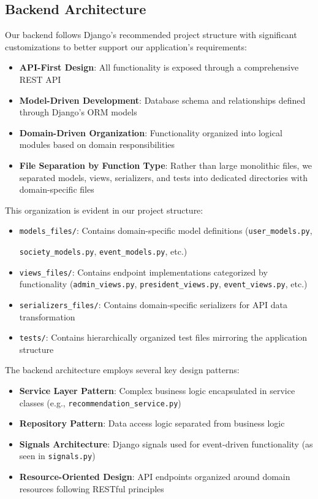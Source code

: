 \subsection{Backend Architecture}

Our backend follows Django's recommended project structure with significant customizations to better support our application's requirements:

\begin{itemize}
    \item \textbf{API-First Design}: All functionality is exposed through a comprehensive REST API
    \item \textbf{Model-Driven Development}: Database schema and relationships defined through Django's ORM models
    \item \textbf{Domain-Driven Organization}: Functionality organized into logical modules based on domain responsibilities
    \item \textbf{File Separation by Function Type}: Rather than large monolithic files, we separated models, views, serializers, and tests into dedicated directories with domain-specific files
\end{itemize}

This organization is evident in our project structure:

\begin{itemize}
    \item \texttt{models\_files/}: Contains domain-specific model definitions (\texttt{user\_models.py}, 
    
    \texttt{society\_models.py}, \texttt{event\_models.py}, etc.)
    \item \texttt{views\_files/}: Contains endpoint implementations categorized by functionality (\texttt{admin\_views.py}, \texttt{president\_views.py}, \texttt{event\_views.py}, etc.)
    \item \texttt{serializers\_files/}: Contains domain-specific serializers for API data transformation
    \item \texttt{tests/}: Contains hierarchically organized test files mirroring the application structure
\end{itemize}

The backend architecture employs several key design patterns:

\begin{itemize}
    \item \textbf{Service Layer Pattern}: Complex business logic encapsulated in service classes (e.g., \texttt{recommendation\_service.py})
    \item \textbf{Repository Pattern}: Data access logic separated from business logic
    \item \textbf{Signals Architecture}: Django signals used for event-driven functionality (as seen in \texttt{signals.py})
    \item \textbf{Resource-Oriented Design}: API endpoints organized around domain resources following RESTful principles
\end{itemize}

